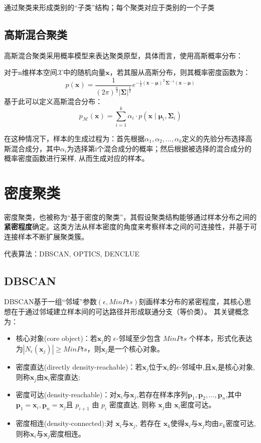 通过聚类来形成类别的“子类”结构；每个聚类对应于类别的一个子类

\subsection{高斯混合聚类}
高斯混合聚类采用概率模型来表达聚类原型，具体而言，使用高斯概率分布：

对于n维样本空间$\mathcal{X}$中的随机向量$\boldsymbol x$，若其服从高斯分布，则其概率密度函数为：\[
p(\boldsymbol{x})=\frac{1}{(2 \pi)^{\frac{n}{2}}|\boldsymbol{\Sigma}|^{\frac{1}{2}}} e^{-\frac{1}{2}(\boldsymbol{x}-\boldsymbol{\mu})^{\mathrm{T}} \boldsymbol{\Sigma}^{-1}(\boldsymbol{x}-\boldsymbol{\mu})}
\]
基于此可以定义高斯混合分布：
\[
p_{\mathcal{M}}(\boldsymbol{x})=\sum_{i=1}^{k} \alpha_{i} \cdot p\left(\boldsymbol{x} \mid \boldsymbol{\mu}_{i}, \boldsymbol{\Sigma}_{i}\right)
\]

在这种情况下，样本的生成过程为：首先根据$\alpha_1, \alpha_2, ...,\alpha_k$定义的先验分布选择高斯混合成分，其中$\alpha_i$为选择第i个混合成分的概率；然后根据被选择的混合成分的概率密度函数进行采样, 从而生成对应的样本。



\section{密度聚类}\label{sec:9.5}

密度聚类，也被称为“基于密度的聚类”，其假设聚类结构能够通过样本分布之间的\textbf{紧密程度}确定。这类方法从样本密度的角度来考察样本之间的可连接性，并基于可连接样本不断扩展聚类簇。

代表算法：DBSCAN, OPTICS, DENCLUE

\subsection{DBSCAN}
DBSCAN基于一组“邻域”参数$(\epsilon, MinPts)$刻画样本分布的紧密程度，其核心思想在于通过邻域建立样本间的可达路径并形成联通分支（等价类）。
其关键概念为：
\begin{itemize}
    \item 核心对象(core object)：若$\boldsymbol x_j$的 $\epsilon$-邻域至少包含 $MinPts$ 个样本，形式化表达为$|N_\epsilon(\boldsymbol x_j)| \ge MinPts$，则$\boldsymbol x_j$是一个核心对象。
    \item 密度直达(directly density-reachable)：若$\boldsymbol x_j$位于$\boldsymbol x_i$的$\epsilon$-邻域中,且$\boldsymbol x_i$是核心对象,则称$\boldsymbol x_j$由$\boldsymbol x_i$密度直达;
    \item 密度可达(density-reachable)：对$\boldsymbol x_i$与$\boldsymbol x_j$,若存在样本序列$\boldsymbol p_1, \boldsymbol p_2,...,\boldsymbol p_n$,其中$\boldsymbol p_1 = \boldsymbol x_i, \boldsymbol p_n = \boldsymbol x_j$且 $p_{i+1}$ 由 $p_i$ 密度直达, 则称 $\boldsymbol x_j$由 $\boldsymbol x_i$密度可达。
    \item 密度相连(density-connected):对 $\boldsymbol x_i$与$\boldsymbol x_j$, 若存在 $\boldsymbol x_k$使得$\boldsymbol x_i$与$\boldsymbol x_j$均由$x_k$密度可达,则称$\boldsymbol x_i$与$\boldsymbol x_j$密度相连。
\end{itemize}

